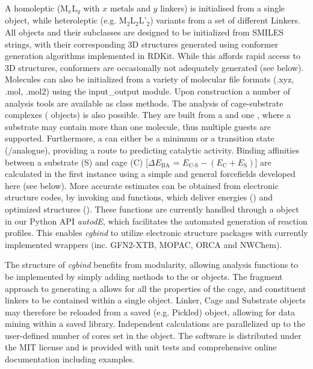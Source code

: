 \documentclass[../../main.tex]{subfiles}
\newcommand{\cgbind}{\emph{cgbind }}
\newcommand{\de}{$\Delta E$}
\begin{document}
A homoleptic  (M$_x$L$_y$ with $x$ metals and $y$ linkers) is initialised from a single  object, while heteroleptic (e.g. M$_2$L$_2$L’$_2$) variants from a set of different Linkers. All  objects and their subclasses are designed to be initialized from SMILES strings,\cite{Weininger1988} with their corresponding 3D structures generated using conformer generation algorithms implemented in RDKit.\cite{Landrum2019, Riniker2015}  While this affords rapid access to 3D structures, conformers are occasionally not adequately generated (see below). Molecules can also be initialized from a variety of molecular file formats (.xyz, .mol, .mol2) using the input\_output module. Upon  construction a number of analysis tools are available as class methods. The analysis of cage-substrate complexes ( objects) is also possible. They are built from a  and one , where a substrate may contain more than one molecule, thus multiple guests are supported. Furthermore, a  can either be a minimum or a transition state (/analogue), providing a route to predicting catalytic activity.
Binding affinities between a substrate (S) and cage (C) [\de$_\text{BA}$ = $E_\text{C-S} - (E_\text{C} + E_\text{S})]$ are calculated in the first instance using a simple and general forcefields developed here (see below). More accurate estimates can be obtained from electronic structure codes, by invoking  and  functions, which deliver energies () and optimized structures (). These functions are currently handled through a  object in our Python API \emph{autodE},\cite{autodE} which facilitates the automated generation of reaction profiles. This enables \cgbind to utilize electronic structure packages with currently implemented wrappers (inc. GFN2-XTB,\cite{Bannwarth2019} MOPAC,\cite{Stewart2016} ORCA\cite{Neese2017} and NWChem\cite{Valiev2010}).

The structure of \cgbind benefits from modularity, allowing analysis functions to be implemented by simply adding methods to the  or  objects. The fragment approach to generating a  allows for all the properties of the cage, and constituent linkers to be contained within a single object. Linker, Cage and Substrate objects may therefore be reloaded from a saved (e.g. Pickled)  object, allowing for data mining within a saved library. Independent calculations are parallelized up to the user-defined number of cores set in the  object. The software is distributed under the MIT license and is provided with unit tests and comprehensive online documentation including examples.
\end{document}
